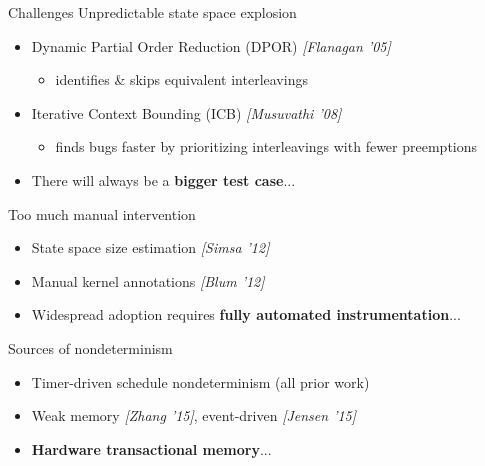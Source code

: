 \documentclass[xcolor=dvipsnames]{beamer}
\begin{document}
\begin{frame}{Challenges} %
	Unpredictable state space explosion
	\begin{itemize}
		\item Dynamic Partial Order Reduction (DPOR) {\em [Flanagan '05]}
			\begin{itemize}
				\item identifies \& skips equivalent interleavings
			\end{itemize}
		\item Iterative Context Bounding (ICB) {\em [Musuvathi '08]}
			\begin{itemize}
				\item finds bugs faster by prioritizing interleavings with fewer preemptions
			\end{itemize}
			\pause
		\item There will always be a {\bf bigger test case}...
	\end{itemize}
	\pause
	\linegap

	Too much manual intervention %
	\begin{itemize}
		\item State space size estimation {\em [Simsa '12]}
		\item Manual kernel annotations {\em [Blum '12]} %
			\pause
		\item Widespread adoption requires {\bf fully automated instrumentation}...
	\end{itemize}
	\pause
	\linegap

	Sources of nondeterminism
	\begin{itemize}
		\item Timer-driven schedule nondeterminism (all prior work)
		\item Weak memory {\em [Zhang '15]},
			event-driven {\em [Jensen '15]}
			\pause
		\item {\bf Hardware transactional memory}...
	\end{itemize}
\end{frame}

\end{document}
